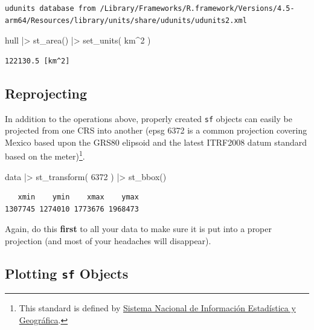 \documentclass[
  letterpaper,
]{book}
\newenvironment{Shaded}{\begin{snugshade}}{\end{snugshade}}
\newcommand{\DecValTok}[1]{\textcolor[rgb]{0.68,0.00,0.00}{#1}}
\newcommand{\FunctionTok}[1]{\textcolor[rgb]{0.28,0.35,0.67}{#1}}
\newcommand{\NormalTok}[1]{\textcolor[rgb]{0.00,0.23,0.31}{#1}}
\newcommand{\SpecialCharTok}[1]{\textcolor[rgb]{0.37,0.37,0.37}{#1}}
\begin{document}
\begin{verbatim}
udunits database from /Library/Frameworks/R.framework/Versions/4.5-arm64/Resources/library/units/share/udunits/udunits2.xml
\end{verbatim}

\begin{Shaded}
\begin{Highlighting}[]
\NormalTok{hull }\SpecialCharTok{|\textgreater{}}
  \FunctionTok{st\_area}\NormalTok{() }\SpecialCharTok{|\textgreater{}}
  \FunctionTok{set\_units}\NormalTok{( km}\SpecialCharTok{\^{}}\DecValTok{2}\NormalTok{ )}
\end{Highlighting}
\end{Shaded}

\begin{verbatim}
122130.5 [km^2]
\end{verbatim}

\subsection{Reprojecting}\label{reprojecting}

In addition to the operations above, properly created \texttt{sf}
objects can easily be projected from one CRS into another (epsg 6372 is
a common projection covering Mexico based upon the GRS80 elipsoid and
the latest ITRF2008 datum standard based on the meter)\footnote{This
  standard is defined by \href{https://www.inegi.org.mx}{Sistema
  Nacional de Información Estadística y Geográfica}.}.

\begin{Shaded}
\begin{Highlighting}[]
\NormalTok{data }\SpecialCharTok{|\textgreater{}}
  \FunctionTok{st\_transform}\NormalTok{( }\DecValTok{6372}\NormalTok{ ) }\SpecialCharTok{|\textgreater{}}
  \FunctionTok{st\_bbox}\NormalTok{()}
\end{Highlighting}
\end{Shaded}

\begin{verbatim}
   xmin    ymin    xmax    ymax 
1307745 1274010 1773676 1968473 
\end{verbatim}

Again, do this \textbf{first} to all your data to make sure it is put
into a proper projection (and most of your headaches will disappear).

\subsection{\texorpdfstring{Plotting \texttt{sf}
Objects}{Plotting sf Objects}}\label{plotting-sf-objects}
\end{document}
